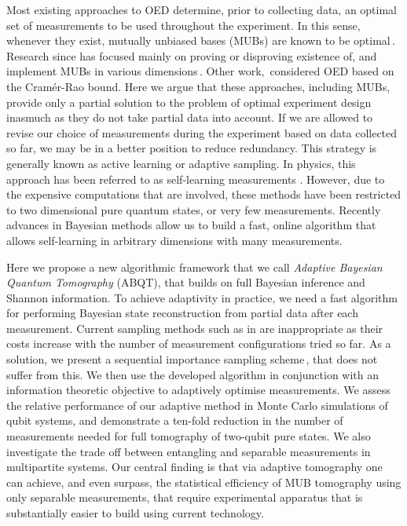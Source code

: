 \documentclass[aps,twocolumn,prl]{revtex4-1}
\begin{document}
Most existing approaches to OED determine, prior to collecting data, an optimal set of measurements to be used throughout the experiment. In this sense, whenever they exist, mutually unbiased bases (MUBs) are known to be optimal\,\cite{MUBFirst,MUBExperiment}. Research since has focused mainly on proving or disproving existence of, and implement MUBs in various dimensions\,\cite{DimensionSix,MUBQutrit,MUBExperiment}. Other work,\,\cite{OEDFirst,OEDAverage} considered OED based on the Cram\'{e}r-Rao bound. Here we argue that these approaches, including MUBs, provide only a partial solution to the problem of optimal experiment design inasmuch as they do not take partial data into account. If we are allowed to revise our choice of measurements during the experiment based on data collected so far, we may be in a better position to reduce redundancy. This strategy is generally known as active learning or adaptive sampling. In physics, this approach has been referred to as self-learning measurements \cite{SelfLearning, SelfLearningExperimental}. However, due to the expensive computations that are involved, these methods have been restricted to two dimensional pure quantum states, or very few measurements. Recently advances in Bayesian methods allow us to build a fast, online algorithm that allows self-learning in arbitrary dimensions with many measurements.

Here we propose a new algorithmic framework that we call \emph{Adaptive Bayesian Quantum Tomography} (ABQT), that builds on full Bayesian inference and Shannon information. 
To achieve adaptivity in practice, we need a fast algorithm for performing Bayesian state reconstruction from partial data after each measurement. Current sampling methods such as in \cite{BayesianTomography} are inappropriate as their costs increase with the number of measurement configurations tried so far. As a solution, we present a sequential importance sampling scheme\,\cite{SMCBook}, that does not suffer from this. We then use the developed algorithm in conjunction with an information theoretic objective to adaptively optimise measurements. We assess the relative performance of our adaptive method in Monte Carlo simulations of qubit systems, and demonstrate a ten-fold reduction in the number of measurements needed for full tomography of two-qubit pure states. We also investigate the trade off between entangling and separable measurements in multipartite systems. Our central finding is that via adaptive tomography one can achieve, and even surpass, the statistical efficiency of MUB tomography using only separable measurements, that require experimental apparatus that is substantially easier to build using current technology.
\end{document}
